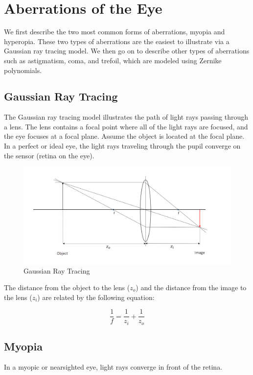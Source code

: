 \chapter{Aberrations of the Eye}

We first describe the two most common forms of aberrations, myopia and hyperopia. These two types of aberrations are the easiest to illustrate via a Gaussian ray tracing model. We then go on to describe other types of aberrations such as astigmatism, coma, and trefoil, which are modeled using Zernike polynomials.  

\section{Gaussian Ray Tracing}

The Gaussian ray tracing model illustrates the path of light rays passing through a lens. The lens contains a focal point where all of the light rays are focused, and the eye focuses at a focal plane. Assume the object is located at the focal plane. In a perfect or ideal eye, the light rays traveling through the pupil converge on the sensor (retina on the eye). 

\begin{figure}[ht]
  \centering
  \includegraphics[width=5.0in]{chapters/chapter2/images/gauss.png}
  \caption{Gaussian Ray Tracing}
  \label{fig:ferrari}
\end{figure}

The distance from the object to the lens ($z_o$) and the distance from the image to the lens ($z_i$) are related by the following equation: 

$$\frac{1}{f} = \frac{1}{z_i} + \frac{1}{z_o}$$
 
\section{Myopia}
In a myopic or nearsighted eye, light rays converge in front of the retina. 

